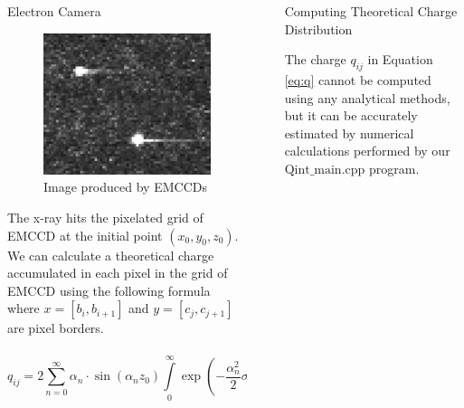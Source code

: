 \documentclass[final]{beamer}
\newlength{\sepwidth}
\newlength{\colwidth}
\newcommand{\separatorcolumn}{\begin{column}{\sepwidth}\end{column}}
\begin{document}
\begin{frame}[t]
\begin{columns}[t]
\begin{column}{\colwidth}
\begin{block}{Electron Camera}
    \begin{figure}[H]
        \centering
        \includegraphics[width=0.6\linewidth]{images/emccd.png}
        \caption{Image produced by EMCCDs}
        \label{fig:emccd}
    \end{figure}

    The x-ray hits the pixelated grid of EMCCD at the initial point $(x_0, y_0, z_0)$. We can calculate a theoretical charge accumulated in each pixel in the grid of EMCCD using the following formula where $x = [b_i, b_{i+1}]$ and $y = [c_j, c_{j+1}]$ are pixel borders.

    \begin{equation} 
    \label{eq:q}
    q_{ij} =    
     2 \sum\limits_{n=0}^\infty 
     \alpha_n  \cdot \sin(\alpha_n z_0)
      \int \limits_{0} ^\infty    \exp \left( - \frac{\alpha_n^2}{2} \sigma^2 \right) 
      \frac{1}{\pi}  \int \limits_{b_i} ^{b_{i+1}}  \int \limits_{c_j} ^{c_{j+1}}   
      \exp \left(  - \frac{r^2}{2 \sigma^2} \right) 
    \frac{dx}{\sqrt{2}\sigma} \cdot \frac{dy} {\sqrt{2} \sigma} \cdot \frac{d\sigma^2}{2}
    \end{equation}

  \end{block}
\end{column}

\separatorcolumn

\begin{column}{\colwidth}

  \begin{block}{Computing Theoretical Charge Distribution}

    The charge $q_{ij}$ in Equation \ref{eq:q} cannot be computed using any analytical methods, but it can be accurately estimated by numerical calculations performed by our $\text{Qint\_main.cpp}$ program.
    \vspace{0.5cm}


\end{block}
\end{column}
\end{columns}
\end{frame}
\end{document}
